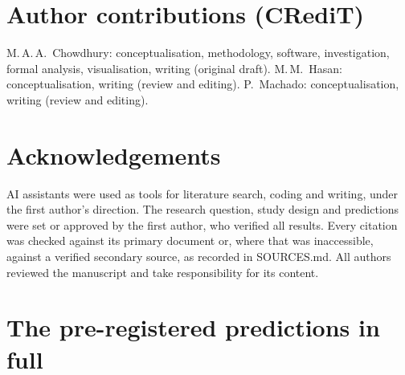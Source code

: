 \documentclass[10pt]{article}
\begin{document}
\section*{Author contributions (CRediT)}
M.\,A.\,A.\ Chowdhury: conceptualisation, methodology, software, investigation, formal analysis,
visualisation, writing (original draft). M.\,M.\ Hasan: conceptualisation, writing (review and
editing). P.\ Machado: conceptualisation, writing (review and editing).

\section*{Acknowledgements}
AI assistants were used as tools for literature search, coding and writing, under the first
author's direction. The research question, study design and predictions were set or approved by
the first author, who verified all results. Every citation was checked against its primary
document or, where that was inaccessible, against a verified secondary source, as recorded in
SOURCES.md. All authors reviewed the manuscript and take responsibility for its content.




\clearpage
\appendix
\renewcommand{\thetable}{A\arabic{table}}
\renewcommand{\theHtable}{A\arabic{table}}
\setcounter{table}{0}
\renewcommand{\thefigure}{A\arabic{figure}}
\renewcommand{\theHfigure}{A\arabic{figure}}
\setcounter{figure}{0}

\section{The pre-registered predictions in full}
\label{app:predictions}
\end{document}
